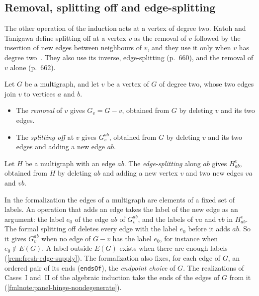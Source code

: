 \subsection{Removal, splitting off and edge-splitting}
\label{sec:molecular-induction-operations}

The other operation of the induction acts at a vertex of degree two.
Katoh and Tanigawa define splitting off at a vertex $v$ as the removal
of $v$ followed by the insertion of new edges between neighbours of
$v$, and they use it only when $v$ has degree two~\cite[\S4.1,
p.~660]{katohTanigawa2011}. They also use its inverse, edge-splitting
(p.~660), and the removal of $v$ alone (p.~662).

\begin{definition}
  \label{def:graph-operations}
  \leanok
  Let $G$ be a multigraph, and let $v$ be a vertex of $G$ of degree two,
  whose two edges join $v$ to vertices $a$ and $b$.
  \begin{itemize}
    \item The \emph{removal} of $v$ gives $G_v = G - v$, obtained from
      $G$ by deleting $v$ and its two edges.
    \item The \emph{splitting off} at $v$ gives $G_v^{ab}$, obtained from
      $G$ by deleting $v$ and its two edges and adding a new edge $ab$.
  \end{itemize}
  Let $H$ be a multigraph with an edge $ab$. The \emph{edge-splitting}
  along $ab$ gives $H_{ab}^v$, obtained from $H$ by deleting $ab$ and
  adding a new vertex $v$ and two new edges $va$ and $vb$.
\end{definition}
\begin{fmlnote}
  \label{fmlnote:graph-operations}
  In the formalization the edges of a multigraph are elements of a fixed
  set of labels. An operation that adds an edge takes the label of the
  new edge as an argument: the label $e_0$ of the edge $ab$ of
  $G_v^{ab}$, and the labels of $va$ and $vb$ in $H_{ab}^v$. The formal
  splitting off deletes every edge with the label $e_0$ before it adds
  $ab$. So it gives $G_v^{ab}$ when no edge of $G - v$ has the label
  $e_0$, for instance when $e_0 \notin E(G)$. A label outside $E(G)$
  exists when there are enough labels (\cref{rem:fresh-edge-supply}).
  The formalization also fixes, for each edge of $G$, an ordered pair of
  its ends (\texttt{endsOf}), the \emph{endpoint choice} of $G$. The
  realizations of Cases~I and~II of the algebraic induction take the
  ends of the edges of $G$ from it
  (\cref{fmlnote:panel-hinge-nondegenerate}).
\end{fmlnote}


